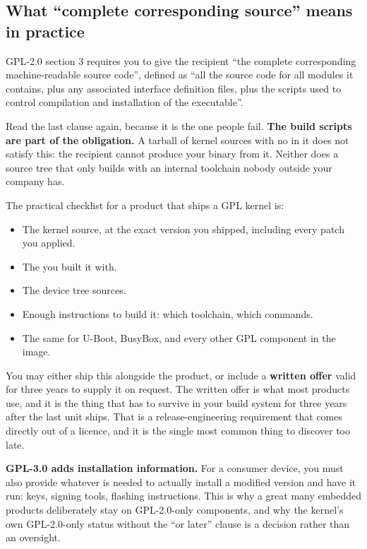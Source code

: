 \subsection{What ``complete corresponding source'' means in practice}
\label{c1:app:b5}

GPL-2.0 section 3 requires you to give the recipient ``the complete corresponding machine-readable
source code'', defined as ``all the source code for all modules it contains, plus any associated
interface definition files, plus the scripts used to control compilation and installation of the
executable''.

Read the last clause again, because it is the one people fail. \textbf{The build scripts are part of
the obligation.} A tarball of kernel sources with no  in it does not satisfy this: the
recipient cannot produce your binary from it. Neither does a source tree that only builds with an
internal toolchain nobody outside your company has.

The practical checklist for a product that ships a GPL kernel is:
\begin{itemize}
  \item The kernel source, at the exact version you shipped, including every patch you applied.
  \item The  you built it with.
  \item The device tree sources.
  \item Enough instructions to build it: which toolchain, which commands.
  \item The same for U-Boot, BusyBox, and every other GPL component in the image.
\end{itemize}
You may either ship this alongside the product, or include a \textbf{written offer} valid for three
years to supply it on request. The written offer is what most products use, and it is the thing that
has to survive in your build system for three years after the last unit ships. That is a
release-engineering requirement that comes directly out of a licence, and it is the single most
common thing to discover too late.

\textbf{GPL-3.0 adds installation information.} For a consumer device, you must also provide
whatever is needed to actually install a modified version and have it run: keys, signing tools,
flashing instructions. This is why a great many embedded products deliberately stay on GPL-2.0-only
components, and why the kernel's own GPL-2.0-only status without the ``or later'' clause is a
decision rather than an oversight.

